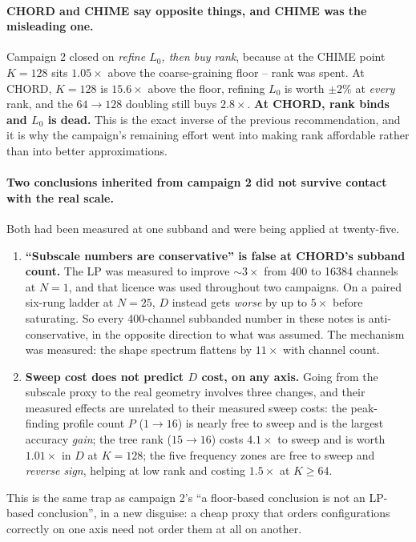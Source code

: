 \documentclass{article}
\numberwithin{equation}{section}   %
\begin{document}
\paragraph{CHORD and CHIME say opposite things, and CHIME was the misleading one.}
Campaign 2 closed on {\em refine $L_0$, then buy rank}, because at the CHIME point $K = 128$ sits
$1.05\times$ above the coarse-graining floor -- rank was spent. At CHORD, $K = 128$ is
$15.6\times$ above the floor, refining $L_0$ is worth $\pm 2\%$ at {\em every} rank, and the
$64 \to 128$ doubling still buys $2.8\times$. {\bf At CHORD, rank binds and $L_0$ is dead.}
This is the exact inverse of the previous recommendation, and it is why the campaign's remaining
effort went into making rank affordable rather than into better approximations.

\paragraph{Two conclusions inherited from campaign 2 did not survive contact with the real scale.}
Both had been measured at one subband and were being applied at twenty-five.

\begin{enumerate}
\item {\bf ``Subscale numbers are conservative'' is false at CHORD's subband count.} The LP was
 measured to improve $\sim 3\times$ from 400 to 16384 channels at $N = 1$, and that licence was
 used throughout two campaigns. On a paired six-rung ladder at $N = 25$, $D$ instead gets
 {\em worse} by up to $5\times$ before saturating. So every 400-channel subbanded number in these
 notes is anti-conservative, in the opposite direction to what was assumed. The mechanism was
 measured: the shape spectrum flattens by $11\times$ with channel count.
\item {\bf Sweep cost does not predict $D$ cost, on any axis.} Going from the subscale proxy to
 the real geometry involves three changes, and their measured effects are unrelated to their
 measured sweep costs: the peak-finding profile count $P$ ($1 \to 16$) is nearly free to sweep and
 is the largest accuracy {\em gain}; the tree rank ($15 \to 16$) costs $4.1\times$ to sweep and is
 worth $1.01\times$ in $D$ at $K = 128$; the five frequency zones are free to sweep and
 {\em reverse sign}, helping at low rank and costing $1.5\times$ at $K \ge 64$.
\end{enumerate}

\par\noindent
This is the same trap as campaign 2's ``a floor-based conclusion is not an LP-based conclusion'',
in a new disguise: a cheap proxy that orders configurations correctly on one axis need not order
them at all on another.
\end{document}
